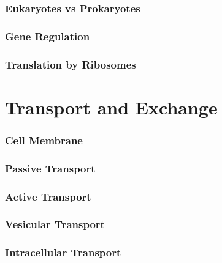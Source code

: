 \documentclass[12pt]{cheatsheet}
\begin{document}
\subsubsection*{Eukaryotes vs Prokaryotes}

\subsubsection*{Gene Regulation}

\subsubsection*{Translation by Ribosomes}



\section*{Transport and Exchange}
\subsubsection*{Cell Membrane}

\subsubsection*{Passive Transport}


\begin{minipage}{0.45\linewidth}
\subsubsection*{Active Transport}

\end{minipage}
\vline \hspace{1mm}
\begin{minipage}{0.5\linewidth}
\subsubsection*{Vesicular Transport}

\vspace{5mm}
\end{minipage}
\subsubsection*{Intracellular Transport}

\end{document}
